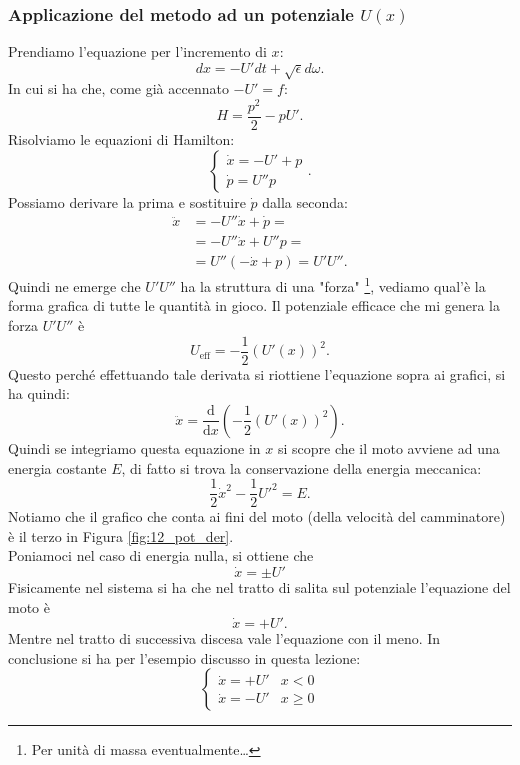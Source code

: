 \subsubsection{Applicazione del metodo ad un potenziale $U(x)$}%
\label{subsub:Applicazione del metodo ad un potenziale $U(x)$}
Prendiamo l'equazione per l'incremento di $x$:
\[
    dx = - U' dt + \sqrt{\epsilon} d\omega
.\] 
In cui si ha che, come già accennato $-U' = f$:
\[
    H = \frac{p^2}{2}-pU'
.\] 
Risolviamo le equazioni di Hamilton:
\[
    \begin{cases}
	\dot{x} = -U' + p\\
	\dot{p} = U''p
    \end{cases}
.\] 
Possiamo derivare la prima e sostituire $\dot{p}$ dalla seconda:
\[\begin{aligned}
    \ddot{x} &= -U'' \dot{x} + \dot{p} =\\
	      & = - U'' \dot{x} + U'' p = \\
	      & = U''\left(- \dot{x} + p\right) = U'U''
.\end{aligned}\]
Quindi ne emerge che $U'U''$ ha la struttura di una "forza"
\footnote{Per unità di massa eventualmente\ldots}, 
vediamo qual'è la forma grafica di tutte le quantità in gioco.
%
\noindent
Il potenziale efficace che mi genera la forza $U'U''$ è 
\[
    U_{\text{eff}} = -\frac{1}{2}\left(U'(x)\right)^2
.\] 
Questo perché effettuando tale derivata si riottiene l'equazione sopra ai grafici, si ha quindi:
\[
    \ddot{x} = \frac{\text{d} }{\text{d} x} \left(-\frac{1}{2}(U'(x) ) ^2\right)
.\] 
Quindi se integriamo questa equazione in $x$ si scopre che il moto avviene ad una energia costante $E$, di fatto si trova la conservazione della energia meccanica:
\[
    \frac{1}{2} \dot{x}^2 - \frac{1}{2} U'^2 = E
.\] 
Notiamo che il grafico che conta ai fini del moto (della velocità del camminatore) è il terzo in Figura \ref{fig:12_pot_der}.\\
Poniamoci nel caso di energia nulla, si ottiene che
\begin{equation}
    \dot{x} = \pm U'
    \label{eq:12_moto}
\end{equation}
Fisicamente nel sistema	si ha che nel tratto di salita sul potenziale l'equazione del moto è 
\[
    \dot{x} =  + U'
.\] 
Mentre nel tratto di successiva discesa vale l'equazione con il meno. In conclusione si ha per l'esempio discusso in questa lezione:
\[
    \begin{cases}
	\dot{x} = + U' & x<0\\
	\dot{x} = -U' & x\ge 0
    \end{cases}
\] 
